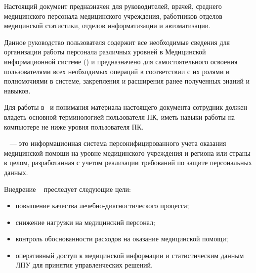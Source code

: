 \newpage
{}

 Настоящий документ предназначен для руководителей, врачей, среднего медицинского персонала медицинского учреждения, работников отделов медицинской статистики, отделов информатизации и автоматизации. 
 
 Данное руководство пользователя содержит все необходимые сведения для организации работы персонала различных уровней в Медицинской информационной системе (\tmis) и предназначено для самостоятельного освоения пользователями всех необходимых операций в соответствии с их ролями и полномочиями в системе, закрепления и расширения ранее полученных знаний и навыков.

 Для работы в \tmis~и понимания материала настоящего документа сотрудник должен владеть основной терминологией пользователя ПК, иметь навыки работы на компьютере не ниже уровня пользователя ПК.

 \tmis~ --- это информационная система персонифицированного учета оказания медицинской помощи на уровне медицинского учреждения и региона или страны в целом, разработанная с учетом реализации требований по защите персональных данных.

 Внедрение \tmis~ преследует следующие цели:
\begin{itemize}
 	\item повышение качества лечебно-диагностического процесса;
 	\item снижение нагрузки на медицинский персонал;
 	\item контроль обоснованности расходов на оказание медицинской помощи;
 	\item оперативный доступ к медицинской информации и статистическим данным ЛПУ для принятия управленческих решений.
\end{itemize}

